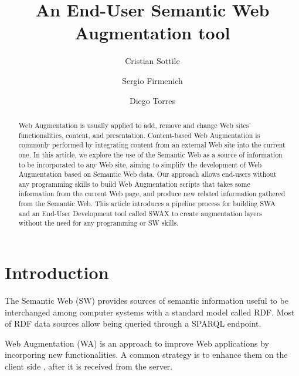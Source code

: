 \documentclass[runningheads,anonymous]{llncs}
\begin{document}
\title{An End-User Semantic Web Augmentation tool}

\author{Cristian Sottile \and
Sergio Firmenich \and
Diego Torres}



\maketitle

\begin{abstract}
    Web Augmentation is usually applied to add, remove and change Web sites' functionalities, content, and presentation. Content-based Web Augmentation is commonly performed by integrating content from an external Web site into the current one. In this article, we explore the use of the Semantic Web as a source of information to be incorporated to any Web site, aiming to simplify the development of Web Augmentation based on Semantic Web data. Our approach allows end-users without any programming skills to build Web Augmentation scripts that takes some information from the current Web page, and produce new related information gathered from the Semantic Web. This article introduces a pipeline process for building SWA and an End-User Development tool called SWAX to create augmentation layers without the need for any programming or SW skills.

\end{abstract}

\section{Introduction}
\label{sec-introduction}

The Semantic Web \cite{Berners-Lee2001TheWeb,Shadbolt2006TheRevisited} (SW) provides sources of semantic information useful to be interchanged among computer systems with a standard model called RDF. Most of RDF data sources allow being queried through a SPARQL endpoint.

Web Augmentation (WA) is an approach to improve Web applications by incorporing new functionalities.  A common strategy is to enhance them on the client side \cite{Bouvin1999UnifyingAugmentation}, after it is received from the server.
\end{document}

